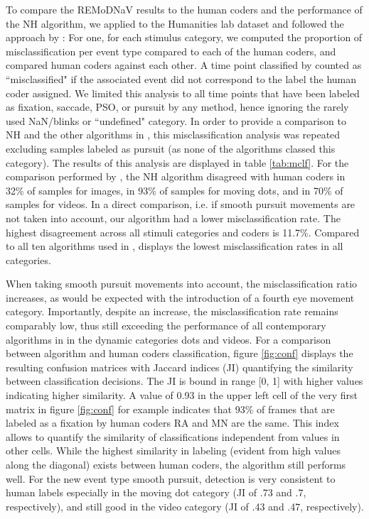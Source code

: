 To compare the REMoDNaV results to the human coders and the performance of the
NH algorithm, we applied \remodnav to the Humanities lab dataset and followed
the approach by \citet{Andersson2017}: For one, for each stimulus category, we
computed the proportion of misclassification per event type compared to each of
the human coders, and compared human coders against each other. A time point
classified by \remodnav counted as ``misclassified" if the associated event did
not correspond to the label the human coder assigned. We limited this analysis
to all time points that have been labeled as fixation, saccade, PSO, or pursuit
by any method, hence ignoring the rarely used NaN/blinks or ``undefined"
category. In order to provide a comparison to NH and the other algorithms in
\cite{Andersson2017}, this misclassification analysis was repeated excluding
samples labeled as pursuit (as none of the algorithms classed this category).
The results of this analysis are displayed in table \ref{tab:mclf}. For the
comparison performed by \citet{Andersson2017}, the NH algorithm disagreed with
human coders in 32\% of samples for images, in 93\% of samples for moving dots,
and in 70\% of samples for videos. In a direct comparison, i.e. if smooth
pursuit movements are not taken into account, our algorithm had a lower
misclassification rate. The highest disagreement across all stimuli categories
and coders is 11.7\%. Compared to all ten algorithms used in
\citet{Andersson2017}, \remodnav displays the lowest misclassification rates in
all categories.

When taking smooth pursuit movements into account, the misclassification ratio
increases, as would be expected with the introduction of a fourth eye movement
category. Importantly, despite an increase, the misclassification rate remains
comparably low, thus still exceeding the performance of all contemporary
algorithms in \citet{Andersson2017} in the dynamic categories dots and videos.
For a comparison between algorithm and human coders classification, figure
\ref{fig:conf} displays the resulting confusion matrices with Jaccard indices
(JI) quantifying the similarity between classification decisions. The JI is
bound in range [0, 1] with higher values indicating higher similarity. A value
of 0.93 in the upper left cell of the very first matrix in figure
\ref{fig:conf} for example indicates that 93\% of frames that are labeled as a
fixation by human coders RA and MN are the same. This index allows to quantify
the similarity of classifications independent from values in other cells. While
the highest similarity in labeling (evident from high values along the
diagonal) exists between human coders, the algorithm still performs well. For
the new event type smooth pursuit, detection is very consistent to human labels
especially in the moving dot category (JI of .73 and .7, respectively), and
still good in the video category (JI of .43 and .47, respectively).

